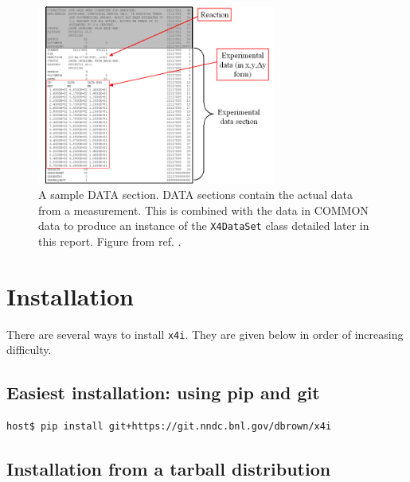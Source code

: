 \documentclass[11pt]{article}
\newcommand{\xfouri}{\texttt{x4i}}
\begin{document}
\begin{figure}[htbp]
\begin{center}
\includegraphics[width=0.7\textwidth]{figs/bib04.png}
\caption{\label{fig:5}A sample DATA section.  DATA sections contain the actual data from a measurement.   This is combined with the data in COMMON data to produce an instance of the \texttt{X4DataSet} class detailed later in this report.  Figure from ref. \cite{web}.}
\end{center}
\end{figure}

\clearpage

\section{Installation}
There are several ways to install \xfouri.  They are given below in order of increasing difficulty.

\subsection{Easiest installation: using pip and git}
\begin{verbatim}
host$ pip install git+https://git.nndc.bnl.gov/dbrown/x4i
\end{verbatim}

\subsection{Installation from a tarball distribution}
\end{document}
